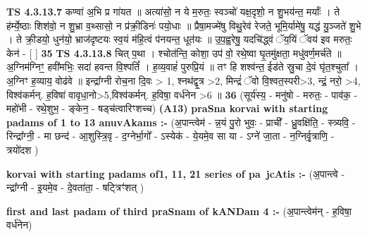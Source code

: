 \documentclass[17pt]{extarticle}
\begin{document}
                  \newline
                                \textbf{ TS 4.3.13.7} \newline
                  कण्वा॑ अ॒भि प्र गा॑यत ॥ अत्या॑सो॒ न ये म॒रुतः॒ स्वञ्चो॑ यक्ष॒दृशो॒ न शु॒भय॑न्त॒ मर्याः᳚ । ते ह॑र्म्ये॒ष्ठाः शिश॑वो॒ न शु॒भ्रा व॒थ्सासो॒ न प्र॑क्री॒डिनः॑ पयो॒धाः ॥ प्रैषा॒मज्मे॑षु विथु॒रेव॑ रेजते॒ भूमि॒र्यामे॑षु॒ यद्ध॑ यु॒ञ्जते॑ शु॒भे । ते क्री॒डयो॒ धुन॑यो॒ भ्राज॑दृष्टयः स्व॒यं म॑हि॒त्वं प॑नयन्त॒ धूत॑यः ॥ उ॒प॒ह्व॒रेषु॒ यदचि॑द्ध्वं ॅय॒यिं ॅवय॑ इव मरुतः॒ केन॑ - [  ] \textbf{  35} \newline
                  \newline
                                \textbf{ TS 4.3.13.8} \newline
                  चित् प॒था । श्चोत॑न्ति॒ कोशा॒ उप॑ वो॒ रथे॒ष्वा घृ॒तमु॑क्षता॒ मधु॑वर्ण॒मर्च॑ते ॥ अ॒ग्निम॑ग्निꣳ॒॒ हवी॑मभिः॒ सदा॑ हवन्त वि॒श्पतिं᳚ । ह॒व्य॒वाहं॑ पुरुप्रि॒यं ॥ तꣳ हि शश्व॑न्त॒ ईड॑ते स्रु॒चा दे॒वं घृ॑त॒श्चुता᳚ । अ॒ग्निꣳ ह॒व्याय॒ वोढ॑वे ॥ इन्द्रा᳚ग्नी रोच॒ना दि॒वः > 1, श्नथ॑द्वृ॒त्र >2, मिन्द्रं॑ ॅवो वि॒श्वत॒स्परी>3, न्द्रं॒ नरो॒ >4, विश्व॑कर्मन्. ह॒विषा॑ वावृधा॒नो>5,विश्व॑कर्मन्. ह॒विषा॒ वर्ध॑नेन >6 ॥ \textbf{  36 } \newline
                  \newline
                      (सूर्य॑स्य॒ - मनु॑षो - मरुतः॒ - पाव॑क॒ - महो॑भी - रथे॒शुभ॒ - ङ्केन॒ - षड्च॑त्वारिꣳशच्च)  \textbf{(A13)} \newline \newline
                \textbf{praSna korvai with starting padams of 1 to 13 anuvAkams :-} \newline
        (अ॒पान्त्वेम॑ - न्न॒यं पु॒रो भुवः॒ - प्राची᳚ - ध्रु॒वक्षि॑ति॒ - स्त्र्यवि॒ - रिन्द्रा᳚ग्नी॒ - मा छन्द॑ - आ॒शुस्त्रि॒वृ - द॒ग्नेर्भा॒गो᳚ - ऽस्येक॑ - ये॒यमे॒व सा या - ऽग्ने॑ जा॒ता - न॒ग्निर्वृ॒त्राणि॒ - त्रयो॑दश ) \newline

        \textbf{korvai with starting padams of1, 11, 21 series of pa~jcAtis :-} \newline
        (अ॒पान्त्वे - न्द्रा᳚ग्नी - इ॒यमे॒व - दे॒वता॑ता॒ - षट्त्रिꣳ॑शत् ) \newline

        \textbf{first and last padam of third praSnam of kANDam 4 :-} \newline
        (अ॒पान्त्वेम॑न् - ह॒विषा॒ वर्ध॑नेन) \newline 
\end{document}
